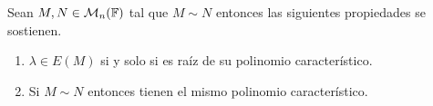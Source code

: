 \begin{teor}
  Sean $M, N \in \mathcal{M}_n(\mathbb{F})$ tal que $M \sim N$ entonces las siguientes propiedades se sostienen.
  \begin{enumerate}
    \item $\lambda \in E(M)$ si y solo si es raíz de su polinomio característico.
    \item Si $M \sim N$ entonces tienen el mismo polinomio característico.
  \end{enumerate}
\end{teor}